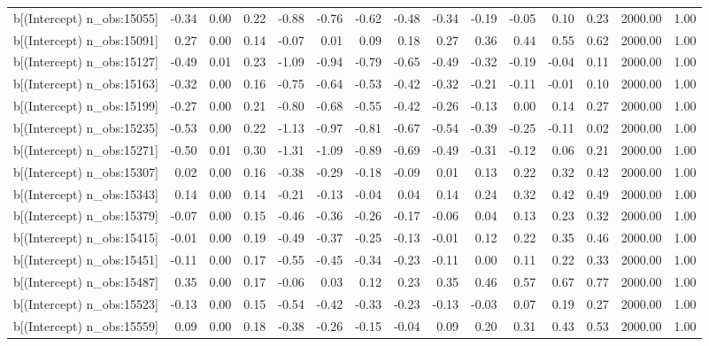 \begin{table}[ht]
\begin{tabular}{rrrrrrrrrrrrrrr}
  b[(Intercept) n\_obs:15055] & -0.34 & 0.00 & 0.22 & -0.88 & -0.76 & -0.62 & -0.48 & -0.34 & -0.19 & -0.05 & 0.10 & 0.23 & 2000.00 & 1.00 \\ 
  b[(Intercept) n\_obs:15091] & 0.27 & 0.00 & 0.14 & -0.07 & 0.01 & 0.09 & 0.18 & 0.27 & 0.36 & 0.44 & 0.55 & 0.62 & 2000.00 & 1.00 \\ 
  b[(Intercept) n\_obs:15127] & -0.49 & 0.01 & 0.23 & -1.09 & -0.94 & -0.79 & -0.65 & -0.49 & -0.32 & -0.19 & -0.04 & 0.11 & 2000.00 & 1.00 \\ 
  b[(Intercept) n\_obs:15163] & -0.32 & 0.00 & 0.16 & -0.75 & -0.64 & -0.53 & -0.42 & -0.32 & -0.21 & -0.11 & -0.01 & 0.10 & 2000.00 & 1.00 \\ 
  b[(Intercept) n\_obs:15199] & -0.27 & 0.00 & 0.21 & -0.80 & -0.68 & -0.55 & -0.42 & -0.26 & -0.13 & 0.00 & 0.14 & 0.27 & 2000.00 & 1.00 \\ 
  b[(Intercept) n\_obs:15235] & -0.53 & 0.00 & 0.22 & -1.13 & -0.97 & -0.81 & -0.67 & -0.54 & -0.39 & -0.25 & -0.11 & 0.02 & 2000.00 & 1.00 \\ 
  b[(Intercept) n\_obs:15271] & -0.50 & 0.01 & 0.30 & -1.31 & -1.09 & -0.89 & -0.69 & -0.49 & -0.31 & -0.12 & 0.06 & 0.21 & 2000.00 & 1.00 \\ 
  b[(Intercept) n\_obs:15307] & 0.02 & 0.00 & 0.16 & -0.38 & -0.29 & -0.18 & -0.09 & 0.01 & 0.13 & 0.22 & 0.32 & 0.42 & 2000.00 & 1.00 \\ 
  b[(Intercept) n\_obs:15343] & 0.14 & 0.00 & 0.14 & -0.21 & -0.13 & -0.04 & 0.04 & 0.14 & 0.24 & 0.32 & 0.42 & 0.49 & 2000.00 & 1.00 \\ 
  b[(Intercept) n\_obs:15379] & -0.07 & 0.00 & 0.15 & -0.46 & -0.36 & -0.26 & -0.17 & -0.06 & 0.04 & 0.13 & 0.23 & 0.32 & 2000.00 & 1.00 \\ 
  b[(Intercept) n\_obs:15415] & -0.01 & 0.00 & 0.19 & -0.49 & -0.37 & -0.25 & -0.13 & -0.01 & 0.12 & 0.22 & 0.35 & 0.46 & 2000.00 & 1.00 \\ 
  b[(Intercept) n\_obs:15451] & -0.11 & 0.00 & 0.17 & -0.55 & -0.45 & -0.34 & -0.23 & -0.11 & 0.00 & 0.11 & 0.22 & 0.33 & 2000.00 & 1.00 \\ 
  b[(Intercept) n\_obs:15487] & 0.35 & 0.00 & 0.17 & -0.06 & 0.03 & 0.12 & 0.23 & 0.35 & 0.46 & 0.57 & 0.67 & 0.77 & 2000.00 & 1.00 \\ 
  b[(Intercept) n\_obs:15523] & -0.13 & 0.00 & 0.15 & -0.54 & -0.42 & -0.33 & -0.23 & -0.13 & -0.03 & 0.07 & 0.19 & 0.27 & 2000.00 & 1.00 \\ 
  b[(Intercept) n\_obs:15559] & 0.09 & 0.00 & 0.18 & -0.38 & -0.26 & -0.15 & -0.04 & 0.09 & 0.20 & 0.31 & 0.43 & 0.53 & 2000.00 & 1.00 \\ 

\end{tabular}
\end{table}
